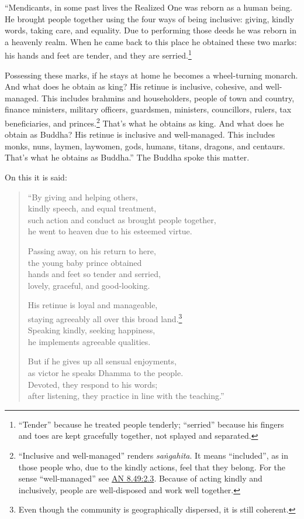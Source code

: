 \documentclass[12pt,openany]{book}%
\begin{document}
“Mendicants, in some past lives the Realized One was reborn as a human being. He brought people together using the four ways of being inclusive: giving, kindly words, taking care, and equality. Due to performing those deeds he was reborn in a heavenly realm. When he came back to this place he obtained these two marks: his hands and feet are tender, and they are serried.\footnote{“Tender” because he treated people tenderly; “serried” because his fingers and toes are kept gracefully together, not splayed and separated. } 

Possessing these marks, if he stays at home he becomes a wheel-turning monarch. And what does he obtain as king? His retinue is inclusive, cohesive, and well-managed. This includes brahmins and householders, people of town and country, finance ministers, military officers, guardsmen, ministers, councillors, rulers, tax beneficiaries, and princes.\footnote{“Inclusive and well-managed” renders \textit{\textsanskrit{saṅgahita}}. It means “included”, as in those people who, due to the kindly actions, feel that they belong. For the sense “well-managed” see \href{https://suttacentral.net/an8.49/en/sujato\#2.3}{AN 8.49:2.3}. Because of acting kindly and inclusively, people are well-disposed and work well together. } That’s what he obtains as king. And what does he obtain as Buddha? His retinue is inclusive and well-managed. This includes monks, nuns, laymen, laywomen, gods, humans, titans, dragons, and centaurs. That’s what he obtains as Buddha.” The Buddha spoke this matter. 

On this it is said: 

\begin{verse}%
“By giving and helping others, \\
kindly speech, and equal treatment, \\
such action and conduct as brought people together, \\
he went to heaven due to his esteemed virtue. 

Passing away, on his return to here, \\
the young baby prince obtained \\
hands and feet so tender and serried, \\
lovely, graceful, and good-looking. 

His retinue is loyal and manageable, \\
staying agreeably all over this broad land.\footnote{Even though the community is geographically dispersed, it is still coherent. } \\
Speaking kindly, seeking happiness, \\
he implements agreeable qualities. 

But if he gives up all sensual enjoyments, \\
as victor he speaks Dhamma to the people. \\
Devoted, they respond to his words; \\
after listening, they practice in line with the teaching.” 

%
\end{verse}
\end{document}
